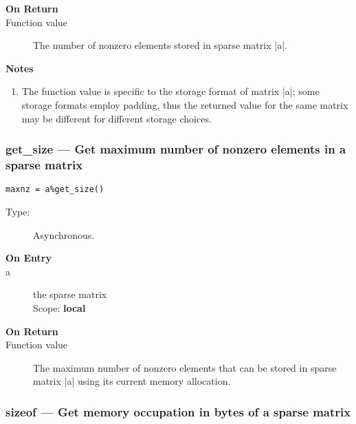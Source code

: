 \begin{description}
\item[\bf On Return]
\item[Function value] The number of nonzero elements stored in sparse matrix \fortinline|a|.
\end{description}

{\par\noindent\bfseries Notes}
\begin{enumerate}
\item The function value is specific to the storage format of matrix
  \fortinline|a|; some storage formats employ padding, thus the returned
  value for the same matrix may be different for different storage choices.
\end{enumerate}

\subsubsection{get\_size  --- Get maximum number of nonzero elements
  in a sparse matrix}

\begin{verbatim}
maxnz = a%get_size()
\end{verbatim}

\begin{description}
\item[Type:] Asynchronous.
\item[\bf On Entry]
\item[a] the sparse matrix\\
Scope: {\bf local}\\
\end{description}

\begin{description}
\item[\bf On Return]
\item[Function value] The maximum number of nonzero elements that can
  be stored in sparse matrix \fortinline|a| using its current memory allocation.
\end{description}

\subsubsection{sizeof  --- Get memory occupation in bytes
of  a sparse matrix}

